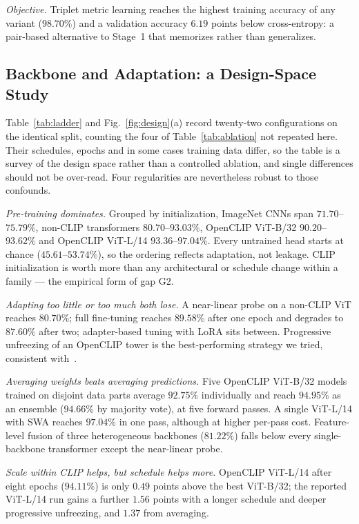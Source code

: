 \documentclass[10pt,journal]{IEEEtran}
\begin{document}
\emph{Objective.} Triplet metric learning reaches the highest training accuracy
of any variant ($98.70\%$) and a validation accuracy $6.19$ points below
cross-entropy: a pair-based alternative to Stage~1 that memorizes rather than
generalizes.

\subsection{Backbone and Adaptation: a Design-Space Study}\label{sec:ladder}
Table~\ref{tab:ladder} and Fig.~\ref{fig:design}(a) record twenty-two
configurations on the identical split, counting the four of
Table~\ref{tab:ablation} not repeated here. Their schedules, epochs and in some
cases training data differ, so the table is a survey of the design space rather
than a controlled ablation, and single differences should not be over-read.
Four regularities are nevertheless robust to those confounds.

\emph{Pre-training dominates.} Grouped by initialization, ImageNet CNNs span
$71.70$--$75.79\%$, non-CLIP transformers $80.70$--$93.03\%$, OpenCLIP ViT-B/32
$90.20$--$93.62\%$ and OpenCLIP ViT-L/14 $93.36$--$97.04\%$. Every untrained head
starts at chance ($45.61$--$53.74\%$), so the ordering reflects adaptation, not
leakage. CLIP initialization is worth more than any architectural or schedule
change within a family --- the empirical form of gap G2.

\emph{Adapting too little or too much both lose.} A near-linear probe on a
non-CLIP ViT reaches $80.70\%$; full fine-tuning reaches $89.58\%$ after one
epoch and degrades to $87.60\%$ after two; adapter-based tuning with LoRA sits
between. Progressive unfreezing of an OpenCLIP tower is the best-performing
strategy we tried, consistent with~\cite{kumar2022finetuning}.

\emph{Averaging weights beats averaging predictions.} Five OpenCLIP ViT-B/32
models trained on disjoint data parts average $92.75\%$ individually and reach
$94.95\%$ as an ensemble ($94.66\%$ by majority vote), at five forward passes. A
single ViT-L/14 with SWA reaches $97.04\%$ in one pass, although at higher
per-pass cost. Feature-level fusion of three heterogeneous backbones
($81.22\%$) falls below every single-backbone transformer except the
near-linear probe.

\emph{Scale within CLIP helps, but schedule helps more.} OpenCLIP ViT-L/14 after
eight epochs ($94.11\%$) is only $0.49$ points above the best ViT-B/32; the
reported ViT-L/14 run gains a further $1.56$ points with a longer schedule and
deeper progressive unfreezing, and $1.37$ from averaging.
\end{document}
